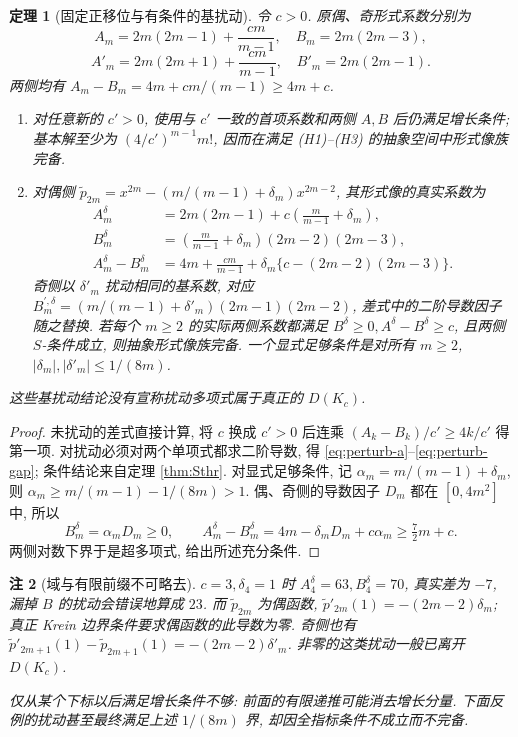 \documentclass[UTF8]{ctexart}
\newtheorem{theorem}{定理}[section]
\newtheorem{remark}[theorem]{注}
\begin{document}
\begin{theorem}[固定正移位与有条件的基扰动]\label{thm:margin}
令 $c>0$. 原偶、奇形式系数分别为
\[
A_m=2m(2m-1)+\frac{cm}{m-1},\quad B_m=2m(2m-3),
\]
\[
A'_m=2m(2m+1)+\frac{cm}{m-1},\quad B'_m=2m(2m-1).
\]
两侧均有 $A_m-B_m=4m+cm/(m-1)\ge4m+c$.
\begin{enumerate}
\item 对任意新的 $c'>0$, 使用与 $c'$ 一致的首项系数和两侧
$A,B$ 后仍满足增长条件; 基本解至少为
$(4/c')^{m-1}m!$, 因而在满足 (H1)--(H3) 的抽象空间中形式像族完备.
\item 对偶侧
$\widetilde p_{2m}=x^{2m}-(m/(m-1)+\delta_m)x^{2m-2}$, 其形式像的真实系数为
\begin{align}
A_m^\delta&=2m(2m-1)+c\left(\frac m{m-1}+\delta_m\right),\label{eq:perturb-a}\\
B_m^\delta&=\left(\frac m{m-1}+\delta_m\right)(2m-2)(2m-3),\label{eq:perturb-b}\\
A_m^\delta-B_m^\delta
&=4m+\frac{cm}{m-1}+\delta_m\{c-(2m-2)(2m-3)\}.\label{eq:perturb-gap}
\end{align}
奇侧以 $\delta'_m$ 扰动相同的基系数, 对应
$B_m^{\prime,\delta}=(m/(m-1)+\delta'_m)(2m-1)(2m-2)$,
差式中的二阶导数因子随之替换.
若\emph{每个} $m\ge2$ 的实际两侧系数都满足
$B^\delta\ge0,A^\delta-B^\delta\ge c$, 且两侧 $S$-条件成立,
则抽象形式像族完备.
一个显式足够条件是对所有 $m\ge2$,
$|\delta_m|,|\delta'_m|\le1/(8m)$.
\end{enumerate}
这些基扰动结论没有宣称扰动多项式属于真正的 $D(K_c)$.
\end{theorem}
\begin{proof}
未扰动的差式直接计算, 将 $c$ 换成 $c'>0$ 后连乘
$(A_k-B_k)/c'\ge4k/c'$ 得第一项.
对扰动必须对两个单项式都求二阶导数, 得
\eqref{eq:perturb-a}--\eqref{eq:perturb-gap}; 条件结论来自定理 \ref{thm:Sthr}.
对显式足够条件, 记 $\alpha_m=m/(m-1)+\delta_m$,
则 $\alpha_m\ge m/(m-1)-1/(8m)>1$.
偶、奇侧的导数因子 $D_m$ 都在 $[0,4m^2]$ 中, 所以
\[
B_m^\delta=\alpha_mD_m\ge0,\qquad
A_m^\delta-B_m^\delta=4m-\delta_mD_m+c\alpha_m
\ge \tfrac72m+c .
\]
两侧对数下界于是超多项式, 给出所述充分条件.
\end{proof}

\begin{remark}[域与有限前缀不可略去]
$c=3,\delta_4=1$ 时 $A_4^\delta=63,B_4^\delta=70$,
真实差为 $-7$, 漏掉 $B$ 的扰动会错误地算成 $23$.
而 $\widetilde p_{2m}$ 为偶函数,
$\widetilde p'_{2m}(1)=-(2m-2)\delta_m$;
真正 Krein 边界条件要求偶函数的此导数为零.
奇侧也有
$\widetilde p'_{2m+1}(1)-\widetilde p_{2m+1}(1)=-(2m-2)\delta'_m$.
非零的这类扰动一般已离开 $D(K_c)$.

仅从某个下标以后满足增长条件不够: 前面的有限递推可能消去增长分量.
下面反例的扰动甚至最终满足上述 $1/(8m)$ 界,
却因全指标条件不成立而不完备.
\end{remark}
\end{document}
